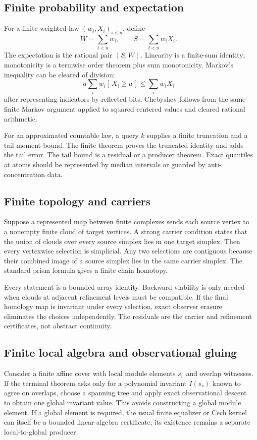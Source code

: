 \subsection{Finite probability and expectation}

For a finite weighted law \((w_i,X_i)_{i<n}\), define
\[
 W=\sum_{i<n}w_i,
 \qquad
 S=\sum_{i<n}w_iX_i.
\]
The expectation is the rational pair \((S,W)\).  Linearity is a finite-sum identity; monotonicity is a termwise order theorem plus sum monotonicity.  Markov's inequality can be cleared of division:
\[
 a\sum_i w_i[\,X_i\geq a\,]
 \leq \sum_i w_iX_i
\]
after representing indicators by reflected bits.  Chebyshev follows from the same finite Markov argument applied to squared centered values and cleared rational arithmetic.

For an approximated countable law, a query \(k\) supplies a finite truncation and a tail moment bound.  The finite theorem proves the truncated identity and adds the tail error.  The tail bound is a residual or a producer theorem.  Exact quantiles at atoms should be represented by median intervals or guarded by anti-concentration data.

\subsection{Finite topology and carriers}

Suppose a represented map between finite complexes sends each source vertex to a nonempty finite cloud of target vertices.  A strong carrier condition states that the union of clouds over every source simplex lies in one target simplex.  Then every vertexwise selection is simplicial.  Any two selections are contiguous because their combined image of a source simplex lies in the same carrier simplex.  The standard prism formula gives a finite chain homotopy.

Every statement is a bounded array identity.  Backward viability is only needed when clouds at adjacent refinement levels must be compatible.  If the final homology map is invariant under every selection, exact observer erasure eliminates the choices independently.  The residuals are the carrier and refinement certificates, not abstract continuity.

\subsection{Finite local algebra and observational gluing}

Consider a finite affine cover with local module elements \(s_v\) and overlap witnesses.  If the terminal theorem asks only for a polynomial invariant \(I(s_v)\) known to agree on overlaps, choose a spanning tree and apply exact observational descent to obtain one global invariant value.  This avoids constructing a global module element.  If a global element is required, the usual finite equalizer or Cech kernel can itself be a bounded linear-algebra certificate; its existence remains a separate local-to-global producer.

